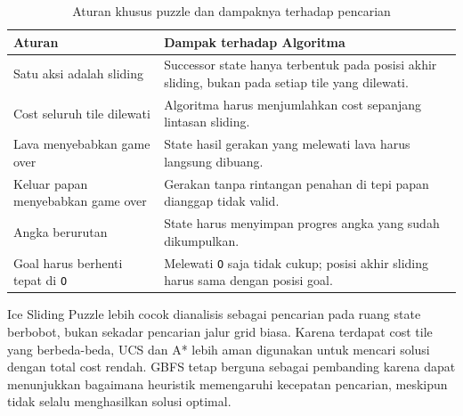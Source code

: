 \begin{table}[H]
	\centering
	\caption{Aturan khusus puzzle dan dampaknya terhadap pencarian}
	\begin{tabular}{|p{4cm}|p{10cm}|}
		\hline
		\rowcolor{cyan!15}
		\textbf{Aturan} & \textbf{Dampak terhadap Algoritma} \\
		\hline
		Satu aksi adalah sliding & Successor state hanya terbentuk pada posisi akhir sliding, bukan pada setiap tile yang dilewati. \\
		\hline
		Cost seluruh tile dilewati & Algoritma harus menjumlahkan cost sepanjang lintasan sliding. \\
		\hline
		Lava menyebabkan game over & State hasil gerakan yang melewati lava harus langsung dibuang. \\
		\hline
		Keluar papan menyebabkan game over & Gerakan tanpa rintangan penahan di tepi papan dianggap tidak valid. \\
		\hline
		Angka berurutan & State harus menyimpan progres angka yang sudah dikumpulkan. \\
		\hline
		Goal harus berhenti tepat di \texttt{O} & Melewati \texttt{O} saja tidak cukup; posisi akhir sliding harus sama dengan posisi goal. \\
		\hline
	\end{tabular}
\end{table}

\begin{tcolorbox}[
	colback=blue!5,
	colframe=blue!60!black,
	title=\textbf{Implikasi Akhir terhadap Pemilihan Algoritma},
	arc=2mm,
	boxrule=0.8pt
]
Ice Sliding Puzzle lebih cocok dianalisis sebagai pencarian pada ruang state berbobot, bukan sekadar pencarian jalur grid biasa. 
Karena terdapat cost tile yang berbeda-beda, UCS dan A* lebih aman digunakan untuk mencari solusi dengan total cost rendah. 
GBFS tetap berguna sebagai pembanding karena dapat menunjukkan bagaimana heuristik memengaruhi kecepatan pencarian, meskipun tidak selalu menghasilkan solusi optimal.
\end{tcolorbox}
